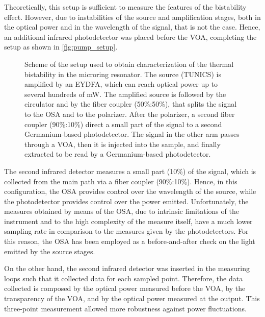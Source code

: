 Theoretically, this setup is sufficient to measure the features of the bistability effect.
However, due to instabilities of the source and amplification stages, both in the optical power and in the wavelength of the signal, that is not the case.
Hence, an additional infrared photodetector was placed before the \ac{VOA}, completing the setup as shown in \autoref{fig:pump_setup}.

\begin{figure}[hbtp]
	\centering
	
	\caption{Scheme of the setup used to obtain characterization of the thermal bistability in the microring resonator.
		The source (TUNICS) is amplified by an \acs{EYDFA}, which can reach optical power up to several hundreds of \si{\mW}.
		The amplified source is followed by the circulator and by the fiber coupler (50\%:50\%), that splits the signal to the \acs{OSA} and to the polarizer.
		After the polarizer, a second fiber coupler (90\%:10\%) direct a small part of the signal to a second Germanium-based photodetector.
		The signal in the other arm passes through a \acf{VOA}, then it is injected into the sample, and finally extracted to be read by a Germanium-based photodetector.
		}
	\label{fig:pump_setup}
\end{figure}

The second infrared detector measures a small part (10\%) of the signal, which is collected from the main path via a fiber coupler (90\%:10\%).
Hence, in this configuration, the \ac{OSA} provides control over the wavelength of the source, while the photodetector provides control over the power emitted.
Unfortunately, the measures obtained by means of the \ac{OSA}, due to intrinsic limitations of the instrument and to the high complexity of the measure itself, have a much lower sampling rate in comparison to the measures given by the photodetectors.
For this reason, the \ac{OSA} has been employed as a before-and-after check on the light emitted by the source stages.

On the other hand, the second infrared detector was inserted in the measuring loops such that it collected data for each sampled point.
Therefore, the data collected is composed by the optical power measured before the \ac{VOA}, by the transparency of the \ac{VOA}, and by the optical power measured at the output.
This three-point measurement allowed more robustness against power fluctuations.


